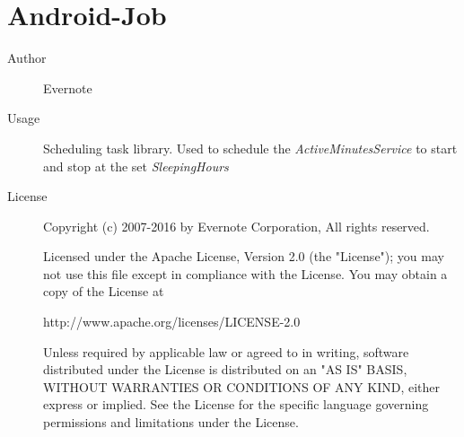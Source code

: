 \section*{Android-Job}
\begin{description}
    \item[Author] Evernote
    \item[Usage] Scheduling task library. Used to schedule the \textit{ActiveMinutesService} to start and stop at the set \textit{SleepingHours}
    \item[License]  Copyright (c) 2007-2016 by Evernote Corporation, All rights reserved.
    
    Licensed under the Apache License, Version 2.0 (the "License");
   you may not use this file except in compliance with the License.
   You may obtain a copy of the License at

       http://www.apache.org/licenses/LICENSE-2.0

   Unless required by applicable law or agreed to in writing, software
   distributed under the License is distributed on an "AS IS" BASIS,
   WITHOUT WARRANTIES OR CONDITIONS OF ANY KIND, either express or implied.
   See the License for the specific language governing permissions and
   limitations under the License.
\end{description}

